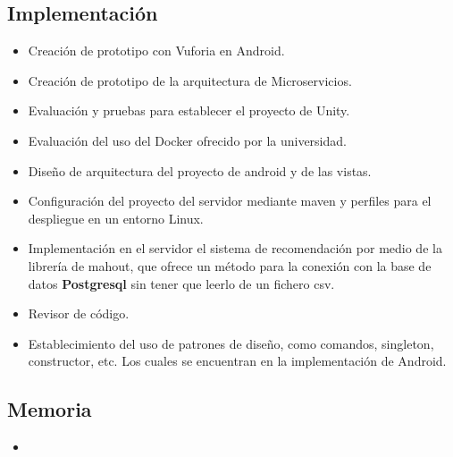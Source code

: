     \subsection{Implementación}
    \label{makereference7.4.3}
        \begin{itemize}  
            \item Creación de prototipo con Vuforia en Android.
            \item Creación de prototipo de la arquitectura de Microservicios.
            \item Evaluación y pruebas para establecer el proyecto de Unity.
            \item Evaluación del uso del Docker ofrecido por la universidad.
            \item Diseño de arquitectura del proyecto de android y de las
             vistas.
            \item Configuración del proyecto del servidor mediante maven y
             perfiles para el despliegue en un entorno Linux.
            \item Implementación en el servidor el sistema de recomendación por medio de la librería de mahout, que ofrece un método para la conexión con la base de datos \textbf{Postgresql} sin tener que leerlo de un fichero csv.
            \item Revisor de código.
            \item Establecimiento del uso de patrones de diseño, como comandos, singleton, constructor, etc. Los cuales se encuentran en la implementación de Android. 
        \end{itemize}
    \subsection{Memoria}
    \label{makereference7.4.3}
        \begin{itemize}
            \item
        \end{itemize}

